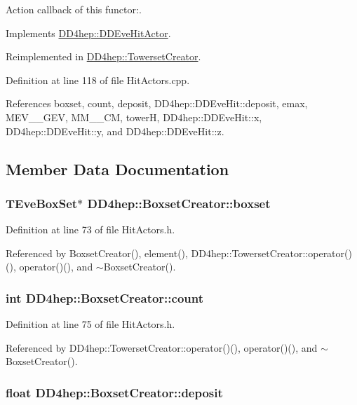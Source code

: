 Action callback of this functor:. 

Implements \hyperlink{struct_d_d4hep_1_1_d_d_eve_hit_actor_a612a0a84bfe41620203555b044019788}{DD4hep::DDEveHitActor}.

Reimplemented in \hyperlink{struct_d_d4hep_1_1_towerset_creator_a5afb1ff94fd502e36e56df19effe7221}{DD4hep::TowersetCreator}.

Definition at line 118 of file HitActors.cpp.

References boxset, count, deposit, DD4hep::DDEveHit::deposit, emax, MEV\_\_\-GEV, MM\_\_\-CM, towerH, DD4hep::DDEveHit::x, DD4hep::DDEveHit::y, and DD4hep::DDEveHit::z.

\subsection{Member Data Documentation}
\hypertarget{struct_d_d4hep_1_1_boxset_creator_a6bc0e7f22172b9a51de26b8e74d2e838}{
\subsubsection[{boxset}]{\setlength{\rightskip}{0pt plus 5cm}TEveBoxSet$\ast$ {\bf DD4hep::BoxsetCreator::boxset}}}
\label{struct_d_d4hep_1_1_boxset_creator_a6bc0e7f22172b9a51de26b8e74d2e838}


Definition at line 73 of file HitActors.h.

Referenced by BoxsetCreator(), element(), DD4hep::TowersetCreator::operator()(), operator()(), and $\sim$BoxsetCreator().\hypertarget{struct_d_d4hep_1_1_boxset_creator_a3c377c27632c9469ef4f821e24fec619}{
\subsubsection[{count}]{\setlength{\rightskip}{0pt plus 5cm}int {\bf DD4hep::BoxsetCreator::count}}}
\label{struct_d_d4hep_1_1_boxset_creator_a3c377c27632c9469ef4f821e24fec619}


Definition at line 75 of file HitActors.h.

Referenced by DD4hep::TowersetCreator::operator()(), operator()(), and $\sim$BoxsetCreator().\hypertarget{struct_d_d4hep_1_1_boxset_creator_af56e8b100eff17e8581503e334c3c6f6}{
\subsubsection[{deposit}]{\setlength{\rightskip}{0pt plus 5cm}float {\bf DD4hep::BoxsetCreator::deposit}}}
\label{struct_d_d4hep_1_1_boxset_creator_af56e8b100eff17e8581503e334c3c6f6}


